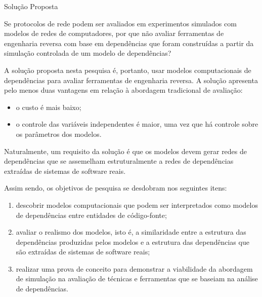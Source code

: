 \begin{section}{Solução Proposta}
	
	
	Se protocolos de rede podem ser avaliados em experimentos simulados com modelos de redes de computadores, por que não avaliar ferramentas de engenharia reversa com base em dependências que foram construídas a partir da simulação controlada de um modelo de dependências? 
	
	A solução proposta nesta pesquisa é, portanto, usar modelos computacionais de dependências para avaliar ferramentas de engenharia reversa. A solução apresenta pelo menos duas vantagens em relação à abordagem tradicional de avaliação:
	
	\begin{itemize}
		\item o custo é mais baixo;
		\item o controle das variáveis independentes é maior, uma vez que há controle sobre os parâmetros dos modelos.
	\end{itemize}
	
	Naturalmente, um requisito da solução é que os modelos devem gerar redes de dependências que se assemelham estruturalmente a redes de dependências extraídas de sistemas de software reais.

	Assim sendo, os objetivos de pesquisa se desdobram nos seguintes itens:
	\begin{enumerate}
		\item descobrir modelos computacionais que podem ser interpretados como modelos de dependências entre entidades de código-fonte;
		\item avaliar o realismo dos modelos, isto é, a similaridade entre a estrutura das dependências produzidas pelos modelos e a estrutura das dependências que são extraídas de sistemas de software reais;
		\item realizar uma prova de conceito para demonstrar a viabilidade da abordagem de simulação na avaliação de técnicas e ferramentas que se baseiam na análise de dependências.
	\end{enumerate}
\end{section}


